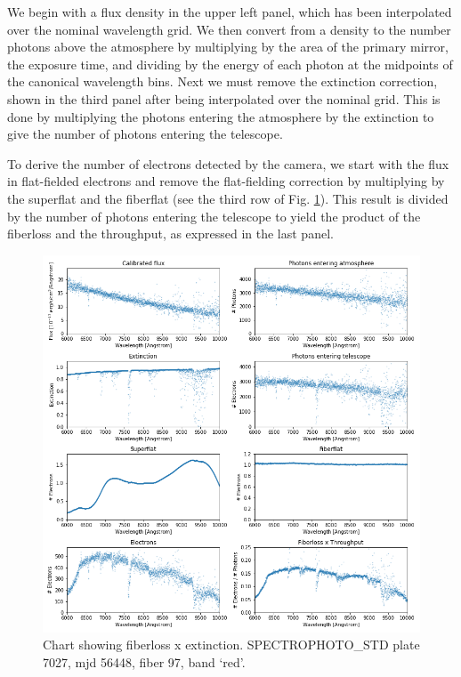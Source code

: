 We begin with a flux density in the upper left panel, which has been interpolated over the nominal wavelength grid. We then convert from a density to the number photons above the atmosphere by multiplying by the area of the primary mirror, the exposure time, and dividing by the energy of each photon at the midpoints of the canonical wavelength bins. Next we must remove the extinction correction, shown in the third panel after being interpolated over the nominal grid. This is done by multiplying the photons entering the atmosphere by the extinction to give the number of photons entering the telescope. 

To derive the number of electrons detected by the camera, we start with the flux in flat-fielded electrons and remove the flat-fielding correction by multiplying by the superflat and the fiberflat (see the third row of Fig. \ref{fig:fiberloss_chart}). This result is divided by the number of photons entering the telescope to yield the product of the fiberloss and the throughput, as expressed in the last panel.

\begin{figure}[h]
\centering
\includegraphics[width=14cm]{images/specsim/fiberloss_chart_red.png}
\caption{Chart showing fiberloss x extinction. SPECTROPHOTO\_STD plate 7027, mjd 56448, fiber 97, band `red'.}
\label{fig:fiberloss_chart}
\end{figure}

